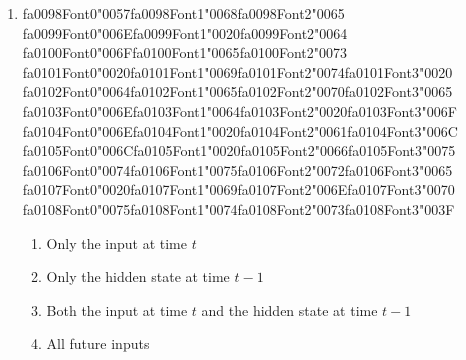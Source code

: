 \documentclass[12pt]{article}
\begin{document}
\begin{enumerate}[label=Q\arabic*.]
\item {\csname fa0098Font0\endcsname\char"0057}{\csname fa0098Font1\endcsname\char"0068}{\csname fa0098Font2\endcsname\char"0065} {\csname fa0099Font0\endcsname\char"006E}{\csname fa0099Font1\endcsname\char"0020}{\csname fa0099Font2\endcsname\char"0064} {\csname fa0100Font0\endcsname\char"006F}{\csname fa0100Font1\endcsname\char"0065}{\csname fa0100Font2\endcsname\char"0073} {\csname fa0101Font0\endcsname\char"0020}{\csname fa0101Font1\endcsname\char"0069}{\csname fa0101Font2\endcsname\char"0074}{\csname fa0101Font3\endcsname\char"0020} {\csname fa0102Font0\endcsname\char"0064}{\csname fa0102Font1\endcsname\char"0065}{\csname fa0102Font2\endcsname\char"0070}{\csname fa0102Font3\endcsname\char"0065} {\csname fa0103Font0\endcsname\char"006E}{\csname fa0103Font1\endcsname\char"0064}{\csname fa0103Font2\endcsname\char"0020}{\csname fa0103Font3\endcsname\char"006F} {\csname fa0104Font0\endcsname\char"006E}{\csname fa0104Font1\endcsname\char"0020}{\csname fa0104Font2\endcsname\char"0061}{\csname fa0104Font3\endcsname\char"006C} {\csname fa0105Font0\endcsname\char"006C}{\csname fa0105Font1\endcsname\char"0020}{\csname fa0105Font2\endcsname\char"0066}{\csname fa0105Font3\endcsname\char"0075} {\csname fa0106Font0\endcsname\char"0074}{\csname fa0106Font1\endcsname\char"0075}{\csname fa0106Font2\endcsname\char"0072}{\csname fa0106Font3\endcsname\char"0065} {\csname fa0107Font0\endcsname\char"0020}{\csname fa0107Font1\endcsname\char"0069}{\csname fa0107Font2\endcsname\char"006E}{\csname fa0107Font3\endcsname\char"0070} {\csname fa0108Font0\endcsname\char"0075}{\csname fa0108Font1\endcsname\char"0074}{\csname fa0108Font2\endcsname\char"0073}{\csname fa0108Font3\endcsname\char"003F}
\begin{enumerate}[label=(\Alph*)]
    \item Only the input at time $t$
    \item Only the hidden state at time $t-1$
    \item Both the input at time $t$ and the hidden state at time $t-1$
    \item All future inputs
\end{enumerate}

\end{enumerate}
\end{document}
